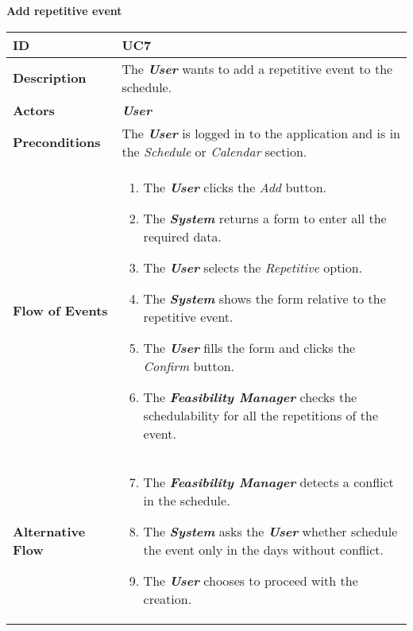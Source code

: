 \begin{center}
	\textbf{Add repetitive event}
\end{center}

\begin{tabularx}{\linewidth}{| l | X|}
	\hline
	\textbf{ID} & UC7\\
	
	\hline
	\textbf{Description} & The \textbf{\textit{User}} wants to add a repetitive event to the schedule.\\
	
	\hline
	\textbf{Actors} & \textbf{\textit{User}}\\
	
	\hline
	\textbf{Preconditions} & The \textbf{\textit{User}} is logged in to the application and is in the \textit{Schedule} or \textit{Calendar} section.\\
	
	\hline
	\textbf{Flow of Events} & \parbox{0.68\textwidth}{\begin{enumerate}
			\item The \textbf{\textit{User}} clicks the \textit{Add} button.
			\item The \textbf{\textit{System}} returns a form to enter all the required data.
			\item The \textbf{\textit{User}} selects the \textit{Repetitive} option.
			\item The \textbf{\textit{System}} shows the form relative to the repetitive event.
			\item The \textbf{\textit{User}} fills the form and clicks the \textit{Confirm} button.
			\item The \textbf{\textit{Feasibility Manager}} checks the schedulability for all the repetitions of the event.
	\end{enumerate}}\\
	
	\hline
	\textbf{Alternative Flow} & \parbox{0.68\textwidth}{ \begin{enumerate}
			\setcounter{enumi}{6}
			\item The \textbf{\textit{Feasibility Manager}} detects a conflict in the schedule. 
			\item The \textit{\textbf{System}} asks the \textbf{\textit{User}} whether schedule the event only in the days without conflict. 
			\item The \textbf{\textit{User}} chooses to proceed with the creation.
	\end{enumerate}}\\


\end{tabularx}

